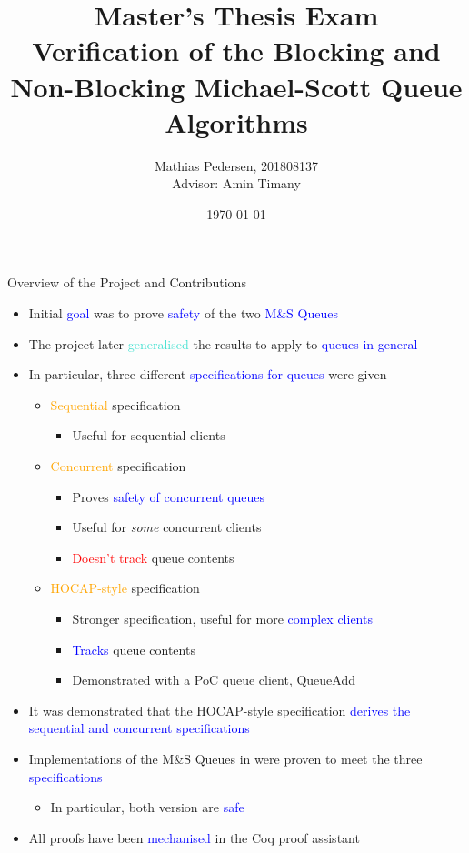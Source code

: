 \documentclass[9pt,xcolor={dvipsnames}]{beamer}
\title{Master's Thesis Exam\\
Verification of the Blocking and Non-Blocking Michael-Scott Queue Algorithms}
\author{
  Mathias Pedersen, 201808137 \texorpdfstring{\\}{with}
  {\small Advisor: Amin Timany}
}
\institute{Aarhus University}
\date{\today}
\newcommand{\msq}{M\&S Queue}
\begin{document}
\frame{\titlepage}


\begin{frame}{Overview of the Project and Contributions}
  \begin{itemize}
    \item Initial \textcolor{blue}{goal} was to prove \textcolor{blue}{safety} of the two \textcolor{blue}{\msq{}s}
    \item The project later \textcolor{Turquoise}{generalised} the results to apply to \textcolor{blue}{queues in general}
    \pause
    \item In particular, three different \textcolor{blue}{specifications for queues} were given
    \begin{itemize}
      \item \textcolor{orange}{Sequential} specification
        \begin{itemize}
          \item Useful for sequential clients
        \end{itemize}
      \item \textcolor{orange}{Concurrent} specification
        \begin{itemize}
          \item Proves \textcolor{blue}{safety of concurrent queues}
          \item Useful for \textit{some} concurrent clients
          \item \textcolor{red}{Doesn't track} queue contents
        \end{itemize}
      \item \textcolor{orange}{HOCAP-style} specification
        \begin{itemize}
          \item Stronger specification, useful for more \textcolor{blue}{complex clients}
          \item \textcolor{blue}{Tracks} queue contents
          \item Demonstrated with a PoC queue client, QueueAdd
        \end{itemize}
    \end{itemize}
    \pause
    \item It was demonstrated that the HOCAP-style specification \textcolor{blue}{derives the sequential and concurrent specifications}
    \pause
    \item \textcolor{ExampleColour}{Implementations} of the \msq{}s in \textcolor{blue}{\heaplang{}} were proven to meet the three \textcolor{blue}{specifications}
      \begin{itemize}
        \item In particular, both version are \textcolor{blue}{safe}
      \end{itemize}
    \pause
    \item All proofs have been \textcolor{blue}{mechanised} in the \textcolor[RGB]{199,154,115}{Coq} \textcolor[RGB]{222,196,152}{proof assistant}
  \end{itemize}
\end{frame}
\end{document}
